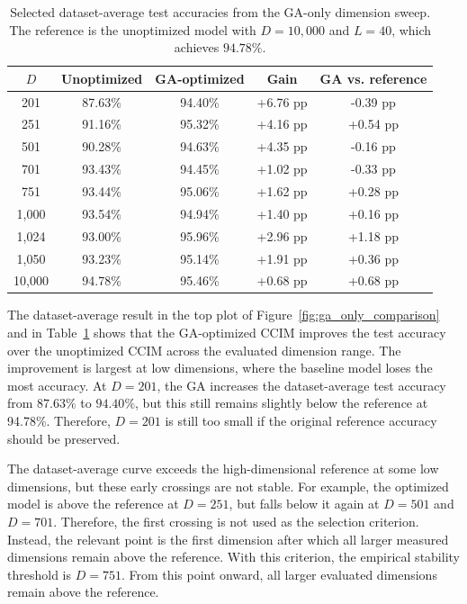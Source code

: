 \begin{table}[htbp]
    \centering
    \caption{Selected dataset-average test accuracies from the GA-only dimension sweep. The reference is the unoptimized model with $D=10{,}000$ and $L=40$, which achieves $94.78\%$.}
    \label{tab:ga_dimension_summary}
    \begin{tabular}{c c c c c}
        \toprule
        \textbf{$D$}
        & \textbf{Unoptimized}
        & \textbf{GA-optimized}
        & \textbf{Gain}
        & \textbf{GA vs. reference} \\
        \midrule
        201    & 87.63\% & 94.40\% & +6.76 pp & -0.39 pp \\
        251    & 91.16\% & 95.32\% & +4.16 pp & +0.54 pp \\
        501    & 90.28\% & 94.63\% & +4.35 pp & -0.16 pp \\
        701    & 93.43\% & 94.45\% & +1.02 pp & -0.33 pp \\
        751    & 93.44\% & 95.06\% & +1.62 pp & +0.28 pp \\
        1,000  & 93.54\% & 94.94\% & +1.40 pp & +0.16 pp \\
        1,024  & 93.00\% & 95.96\% & +2.96 pp & +1.18 pp \\
        1,050  & 93.23\% & 95.14\% & +1.91 pp & +0.36 pp \\
        10,000 & 94.78\% & 95.46\% & +0.68 pp & +0.68 pp \\
        \bottomrule
    \end{tabular}
\end{table}

The dataset-average result in the top plot of Figure~\ref{fig:ga_only_comparison} and in Table~\ref{tab:ga_dimension_summary} shows that the GA-optimized CCIM improves the test accuracy over the unoptimized CCIM across the evaluated dimension range. The improvement is largest at low dimensions, where the baseline model loses the most accuracy. At $D=201$, the GA increases the dataset-average test accuracy from $87.63\%$ to $94.40\%$, but this still remains slightly below the reference at 94.78\%. Therefore, $D=201$ is still too small if the original reference accuracy should be preserved.

The dataset-average curve exceeds the high-dimensional reference at some low dimensions, but these early crossings are not stable. For example, the optimized model is above the reference at $D=251$, but falls below it again at $D=501$ and $D=701$. Therefore, the first crossing is not used as the selection criterion. Instead, the relevant point is the first dimension after which all larger measured dimensions remain above the reference.
With this criterion, the empirical stability threshold is $D=751$. From this point onward, all larger evaluated dimensions remain above the reference. \\

